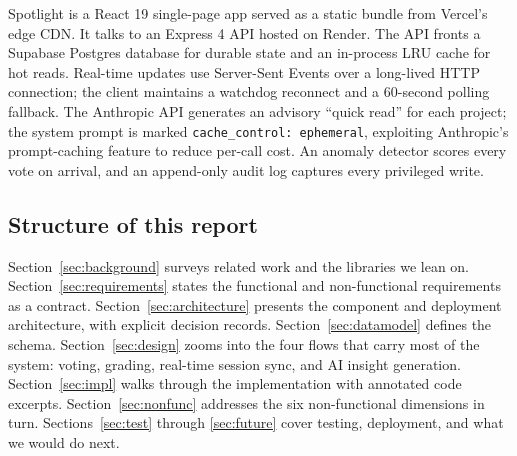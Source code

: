 Spotlight is a React 19 single-page app served as a static bundle from
Vercel's edge CDN. It talks to an Express 4 API hosted on Render. The API
fronts a Supabase Postgres database for durable state and an in-process LRU
cache for hot reads. Real-time updates use Server-Sent Events over a
long-lived HTTP connection; the client maintains a watchdog reconnect and a
60-second polling fallback. The Anthropic API generates an advisory
``quick read'' for each project; the system prompt is marked
\texttt{cache\_control: ephemeral}, exploiting Anthropic's prompt-caching
feature to reduce per-call cost. An anomaly detector scores every vote on
arrival, and an append-only audit log captures every privileged write.

\subsection{Structure of this report}

Section~\ref{sec:background} surveys related work and the libraries we lean
on. Section~\ref{sec:requirements} states the functional and non-functional
requirements as a contract. Section~\ref{sec:architecture} presents the
component and deployment architecture, with explicit decision records.
Section~\ref{sec:datamodel} defines the schema. Section~\ref{sec:design}
zooms into the four flows that carry most of the system: voting, grading,
real-time session sync, and AI insight generation. Section~\ref{sec:impl}
walks through the implementation with annotated code excerpts.
Section~\ref{sec:nonfunc} addresses the six non-functional dimensions in
turn. Sections~\ref{sec:test} through \ref{sec:future} cover testing,
deployment, and what we would do next.
